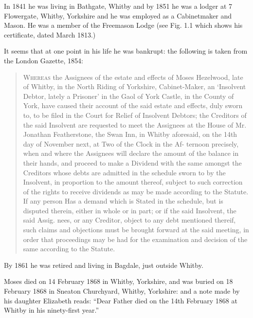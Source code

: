 In 1841 he was living in Bathgate, Whitby \cite{MHezelwood1841} and by 1851 he was a lodger at 7 Flowergate, Whitby, Yorkshire and he was employed as a Cabinetmaker and Mason.\cite{MHezelwood1851}  He was a member of the Freemason Lodge (see Fig. 1.1 which shows his certificate, dated March 1813.)

It seems that at one point in his life he was bankrupt: the following is taken from the London Gazette, 1854:\cite{MHezelwoodBankruptcy}

\begin{quotation}
\textsc{Whereas} the Assignees of the estate and effects of Moses Hezelwood, late of Whitby, in the North Riding of Yorkshire, Cabinet-Maker, an `Insolvent Debtor, lately a Prisoner' in the Gaol of York Castle, in the County of York, have caused their account of the said estate and effects, duly sworn to, to be filed in the Court for Relief of Insolvent Debtors; the Creditors of the said Insolvent are requested to meet the Assignees at the House of Mr. Jonathan Featherstone, the Swan Inn, in Whitby aforesaid, on the 14th day of November next, at Two of the Clock in the Af- ternoon precisely, when and where the Assignees will declare the amount of the balance in their hands, and proceed to make a Dividend with the same amongst the Creditors whose debts are admitted in the schedule sworn to by the Insolvent, in proportion to the amount thereof, subject to such correction of the rights to receive dividends as may be made according to the Statute. If any person Has a demand which is Stated in the schedule, but is disputed therein, either in whole or in part; or if the said Insolvent, the said Assig. nees, or any Creditor, object to any debt mentioned thereif, such claims and objections must be brought forward at the said meeting, in order that proceedings may be had for the examination and decision of the same according to the Statute.
\end{quotation}

By 1861 he was retired and living in Bagdale, just outside Whitby. \cite{MHezelwood1861}

Moses died on 14 February 1868 in Whitby, Yorkshire, and was buried on 18 February 1868 in Sneaton Churchyard,	Whitby, Yorkshire: \cite{MHezelwoodDeath} and a note made by his daughter Elizabeth reads: ``Dear Father died on the 14th February 1868 at Whitby in his ninety-first year.''

